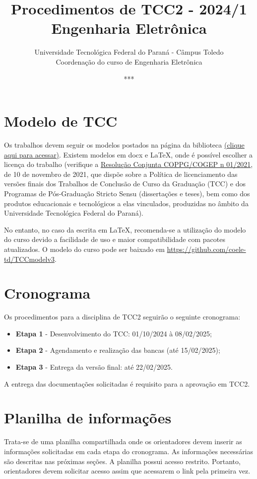 \documentclass[a4paper, 12pt]{article}
\title{Procedimentos de TCC2 - 2024/1\\\textbf{Engenharia Eletrônica}}
\date{***}
\author{Universidade Tecnológica Federal do Paraná - Câmpus Toledo\\Coordenação do curso de Engenharia Eletrônica}
\newcommand{\startdate}{01/10/2024}		%
\newcommand{\agendadate}{08/02/2025}	%
\newcommand{\bancadate}{15/02/2025}		%
\newcommand{\finaldate}{22/02/2025}		%
\begin{document}
    \maketitle
    
    \section{Modelo de TCC}
    Os trabalhos devem seguir os modelos postados na página da biblioteca \href{http://portal.utfpr.edu.br/biblioteca/trabalhos-academicos}{(clique aqui para acessar)}. Existem modelos em docx e \LaTeX, onde é possível escolher a licença do trabalho (verifique a \href{https://sei.utfpr.edu.br/sei/publicacoes/controlador_publicacoes.php?acao=publicacao_visualizar&id_documento=2615190&id_orgao_publicacao=0}{Resolução Conjunta COPPG/COGEP n\textordmasculine{} 01/2021}, de 10 de novembro de 2021, que dispõe sobre a Política de licenciamento das versões finais dos Trabalhos de Conclusão de Curso da Graduação (TCC) e dos Programas de Pós-Graduação Stricto Sensu (dissertações e teses), bem como dos produtos educacionais e tecnológicos a elas vinculados, produzidas no âmbito da Universidade Tecnológica Federal do Paraná).

	No entanto, no caso da escrita em \LaTeX{}, recomenda-se a utilização do modelo do curso devido a facilidade de uso e maior compatibilidade com pacotes atualizados. O modelo do curso pode ser baixado em \url{https://github.com/coele-td/TCCmodelv3}.
    
    \section{Cronograma}
    \label{sec:CRO}
    
    Os procedimentos para a disciplina de TCC2 seguirão o seguinte cronograma:
    \begin{itemize}
    	\item \textbf{Etapa 1} - Desenvolvimento do TCC: \startdate{} à \agendadate;
    	\item \textbf{Etapa 2} - Agendamento e realização das bancas (até \bancadate);
    	\item \textbf{Etapa 3} - Entrega da versão final: até \finaldate.    	
    \end{itemize}

	A entrega das documentações solicitadas é requisito para a aprovação em TCC2.

	\section{Planilha de informações}
	\label{sec:pla}
	Trata-se de uma planilha compartilhada onde os orientadores  devem inserir as informações solicitadas em cada etapa do cronograma. As informações necessárias são descritas nas próximas seções. A planilha possui acesso restrito. Portanto, orientadores devem solicitar acesso assim que acessarem o link pela primeira vez.
	
\end{document}
